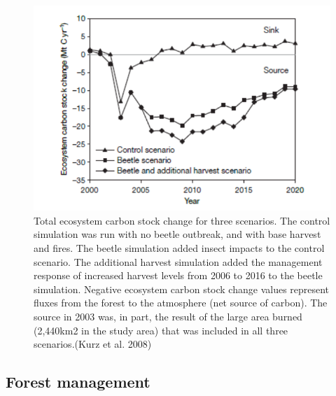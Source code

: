 \documentclass[12pt,oneside]{book}
\begin{document}
\begin{figure}

{\centering \includegraphics[width=0.8\linewidth]{figures/chap8/f812_Kurz3} 

}

\caption{Total ecosystem carbon stock change for three scenarios. The control simulation was run with no beetle outbreak, and with base harvest and fires. The beetle simulation added insect impacts to the control scenario. The additional harvest simulation added the management response of increased harvest levels from 2006 to 2016 to the beetle simulation. Negative ecosystem carbon stock change values represent fluxes from the forest to the atmosphere (net source of carbon). The source in 2003 was, in part, the result of the large area burned (2,440km2 in the study area) that was included in all three scenarios.(Kurz et al. 2008)}\label{fig:f812}
\end{figure}

\subsection{Forest management}\label{forest-management}
\end{document}
